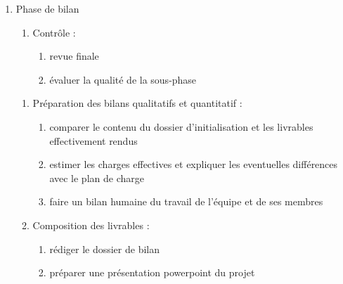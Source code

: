 \begin{enumerate}
\item Phase de bilan

          \begin{enumerate}
            \item Contrôle :
                \begin{enumerate}
                  \item revue finale
                  \item évaluer la qualité de la sous-phase
                \end{enumerate}
          \end{enumerate}

          \begin{enumerate}
            \item Préparation des bilans qualitatifs et quantitatif : 
                \begin{enumerate}
                  \item comparer le contenu du dossier d'initialisation et les livrables effectivement rendus
                  \item estimer les charges effectives et expliquer les eventuelles différences avec le plan de charge
                  \item faire un bilan humaine du travail de l'équipe et de ses membres
                \end{enumerate}
            \item Composition des livrables : 
                \begin{enumerate}
                  \item rédiger le dossier de bilan
                  \item préparer une présentation powerpoint du projet
                \end{enumerate}
          \end{enumerate}

\end{enumerate}
